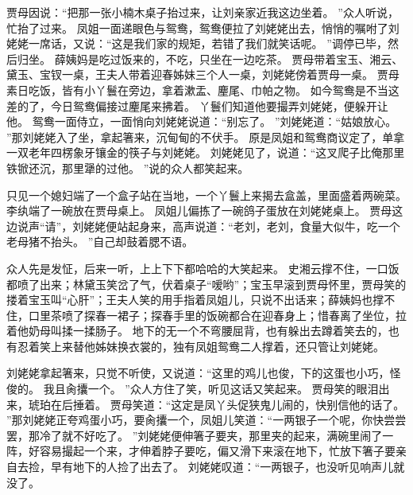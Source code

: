 贾母因说：“把那一张小楠木桌子抬过来，让刘亲家近我这边坐着。
”众人听说，忙抬了过来。
凤姐一面递眼色与鸳鸯，鸳鸯便拉了刘姥姥出去，悄悄的嘱咐了刘姥姥一席话，又说：“这是我们家的规矩，若错了我们就笑话呢。
”调停已毕，然后归坐。
薛姨妈是吃过饭来的，不吃，只坐在一边吃茶。
贾母带着宝玉、湘云、黛玉、宝钗一桌，王夫人带着迎春姊妹三个人一桌，刘姥姥傍着贾母一桌。
贾母素日吃饭，皆有小丫鬟在旁边，拿着漱盂、麈尾、巾帕之物。
如今鸳鸯是不当这差的了，今日鸳鸯偏接过麈尾来拂着。
丫鬟们知道他要撮弄刘姥姥，便躲开让他。
鸳鸯一面侍立，一面悄向刘姥姥说道：“别忘了。
”刘姥姥道：“姑娘放心。
”那刘姥姥入了坐，拿起箸来，沉甸甸的不伏手。
原是凤姐和鸳鸯商议定了，单拿一双老年四楞象牙镶金的筷子与刘姥姥。
刘姥姥见了，说道：“这叉爬子比俺那里铁锨还沉，那里犟的过他。
”说的众人都笑起来。
\par
只见一个媳妇端了一个盒子站在当地，一个丫鬟上来揭去盒盖，里面盛着两碗菜。
李纨端了一碗放在贾母桌上。
凤姐儿偏拣了一碗鸽子蛋放在刘姥姥桌上。
贾母这边说声“请”，刘姥姥便站起身来，高声说道：“老刘，老刘，食量大似牛，吃一个老母猪不抬头。
”自己却鼓着腮不语。
\par
众人先是发怔，后来一听，上上下下都哈哈的大笑起来。
史湘云撑不住，一口饭都喷了出来；林黛玉笑岔了气，伏着桌子“嗳哟”；宝玉早滚到贾母怀里，贾母笑的搂着宝玉叫“心肝”；王夫人笑的用手指着凤姐儿，只说不出话来；薛姨妈也撑不住，口里茶喷了探春一裙子；探春手里的饭碗都合在迎春身上；惜春离了坐位，拉着他奶母叫揉一揉肠子。
地下的无一个不弯腰屈背，也有躲出去蹲着笑去的，也有忍着笑上来替他姊妹换衣裳的，独有凤姐鸳鸯二人撑着，还只管让刘姥姥。
\par
刘姥姥拿起箸来，只觉不听使，又说道：“这里的鸡儿也俊，下的这蛋也小巧，怪俊的。
我且肏攮一个。
”众人方住了笑，听见这话又笑起来。
贾母笑的眼泪出来，琥珀在后捶着。
贾母笑道：“这定是凤丫头促狭鬼儿闹的，快别信他的话了。
”那刘姥姥正夸鸡蛋小巧，要肏攮一个，凤姐儿笑道：“一两银子一个呢，你快尝尝罢，那冷了就不好吃了。
”刘姥姥便伸箸子要夹，那里夹的起来，满碗里闹了一阵，好容易撮起一个来，才伸着脖子要吃，偏又滑下来滚在地下，忙放下箸子要亲自去捡，早有地下的人捡了出去了。
刘姥姥叹道：“一两银子，也没听见响声儿就没了。
